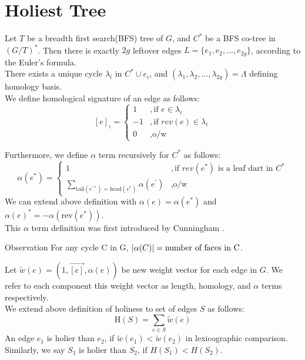 \documentclass{article}
\begin{document}
\section{Holiest Tree}
Let $T$ be a breadth first search(BFS) tree of $G$, and $C^{*}$ be a BFS 
co-tree in $(G/T)^*$. Then there is exactly $2g$ leftover edges 
$L = \{e_1, e_2, \ldots, e_{2g}\}$, according to the Euler's formula. \\

There exists a unique cycle $\lambda_i$ in $C^{*} \cup {e_i}$, and $(\lambda_1, 
\lambda_2, \ldots, \lambda_{2g}) = \Lambda$ defining homology basis. \\
We define homological signature of an edge as follows:
\[ [e]_{i} = \begin{cases} 1 & ,\mbox{if } e \in \lambda_i \\
                          -1 & ,\mbox{if } rev(e) \in \lambda_i \\
                           0 & ,\mbox{o/w} \end{cases}\]

Furthermore, we define $\alpha$  term recursively for $C^*$ as follows: \\
\[ \alpha(e^*) = 
  \begin{cases} 1 & ,\mbox{if } rev(e^*) \mbox{ is a leaf dart in } C^{*} \\
                           \sum \limits_{ \text{tail}(e^{'*})
                           = \text{head}(e^*) } \alpha(e^{'}) & ,
                           \mbox{o/w} \end{cases}\]
We can extend above definition with $\alpha(e) = \alpha(e^*)$ and 
  $\alpha(e)^* = - \alpha(\text{rev}(e^*))$. \\

This $\alpha$ term definition was first introduced by Cunningham \cite{cunningham1976network}.

\begin{oneshot}{Observation}
For any cycle C in G, $\mathopen| \alpha(C) \mathclose| = \text{number of faces in C}$.
\end{oneshot}

Let $\tilde w(e) = ( 1, \vec{[e]}, \alpha(e) )$ be new
weight vector for each edge in $G$. We refer to each component this weight vector
as length, homology, and $\alpha$ terms respectively. \\

We extend above definition of holiness to set of edges $S$ as follows:
\[\text{H}(S) = \sum \limits_{e \in S} \tilde w(e)\]
An edge $e_1$ is holier than $e_2$, 
if $\tilde w(e_1) < \tilde w(e_2)$ in lexicographic comparison. 
Similarly, we say $S_1$ is holier than $S_2$, if $H(S_1) < H(S_2)$. \\
\end{document}
